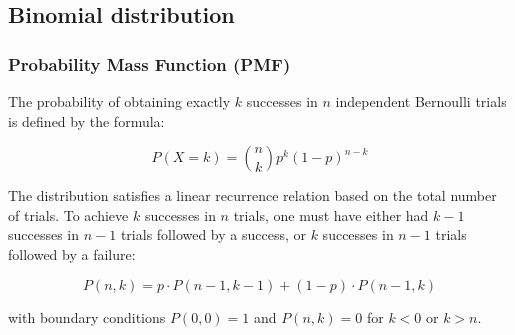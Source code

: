 \subsection{Binomial distribution}

\subsubsection{Probability Mass Function (PMF)}

The probability of obtaining exactly $k$ successes in $n$ independent Bernoulli trials is defined by the formula:

$$P(X = k) = \binom{n}{k} p^k (1-p)^{n-k}$$

The distribution satisfies a linear recurrence relation based on the total number of trials. To achieve $k$ successes in $n$ trials, one must have either had $k-1$ successes in $n-1$ trials followed by a success, or $k$ successes in $n-1$ trials followed by a failure:

$$P(n, k) = p \cdot P(n-1, k-1) + (1-p) \cdot P(n-1, k)$$

with boundary conditions $P(0, 0) = 1$ and $P(n, k) = 0$ for $k < 0$ or $k > n$.
